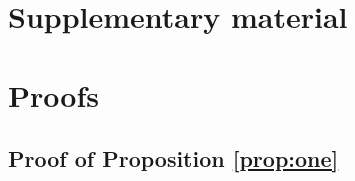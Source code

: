 \documentclass[12pt]{article}
\def\cred{\textcolor{red}}
\begin{document}


\newpage
\section*{Supplementary material}



\renewcommand{\thethm}{S\arabic{theorem}}
\renewcommand{\theprop}{S\arabic{prop}}
\renewcommand{\thelemma}{S\arabic{lemma}}
\renewcommand{\thefigure}{S\arabic{figure}}
\renewcommand{\thetable}{S\arabic{table}}
\renewcommand{\thesection}{S\arabic{section}}
\renewcommand{\theequation}{S\arabic{equation}}

\section{Proofs}

\subsection{Proof of Proposition \ref{prop:one}} \label{sec:proof_prop1}
\end{document}
